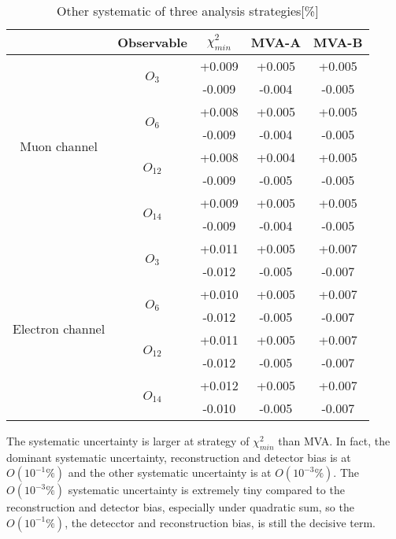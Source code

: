 		\begin{center}
		\setlength{\tabcolsep}{12pt}
		\begin{longtable}{ | c | c | c c c | }
		\caption{Other systematic of three analysis strategies[\%]} \\
		\hline
		 & Observable & $\chi^2_{min}$ & MVA-A & MVA-B \\ 
		\hline
		\multirow{8}{5em}{Muon channel} & \multirow{2}{2em}{$O_{3}$} & +0.009 & +0.005 & +0.005 \\
		 &  & -0.009 & -0.004 & -0.005 \\ 
		 & \multirow{2}{2em}{$O_{6}$} & +0.008 & +0.005 & +0.005 \\
		 &  & -0.009 & -0.004 & -0.005 \\ 
		 & \multirow{2}{2em}{$O_{12}$} & +0.008 & +0.004 & +0.005 \\
		 &  & -0.009 & -0.005 & -0.005 \\ 
		 & \multirow{2}{2em}{$O_{14}$} & +0.009 & +0.005 & +0.005 \\
		 &  & -0.009 & -0.004 & -0.005 \\ 
		 \hline
		\multirow{8}{5em}{Electron channel} & \multirow{2}{2em}{$O_{3}$} & +0.011 & +0.005 & +0.007 \\
		 &  & -0.012 & -0.005 & -0.007 \\ 
		 & \multirow{2}{2em}{$O_{6}$} & +0.010 & +0.005 & +0.007 \\
		 &  & -0.012 & -0.005 & -0.007 \\ 
		 & \multirow{2}{2em}{$O_{12}$} & +0.011 & +0.005 & +0.007 \\
		 &  & -0.012 & -0.005 & -0.007 \\ 
		 & \multirow{2}{2em}{$O_{14}$} & +0.012 & +0.005 & +0.007 \\
		 &  & -0.010 & -0.005 & -0.007 \\ 
		\hline
		\end{longtable}
		\end{center}
		\FloatBarrier

		The systematic uncertainty is larger at strategy of $\chi^2_{min}$ than MVA. In fact, the dominant systematic uncertainty, reconstruction and detector bias is at $O(10^{-1}\%)$ and the other systematic uncertainty is at $O(10^{-3}\%)$. The $O(10^{-3}\%)$ systematic uncertainty is extremely tiny compared to the reconstruction and detector bias, especially under quadratic sum, so the $O(10^{-1}\%)$, the detecctor and reconstruction bias, is still the decisive term. 

